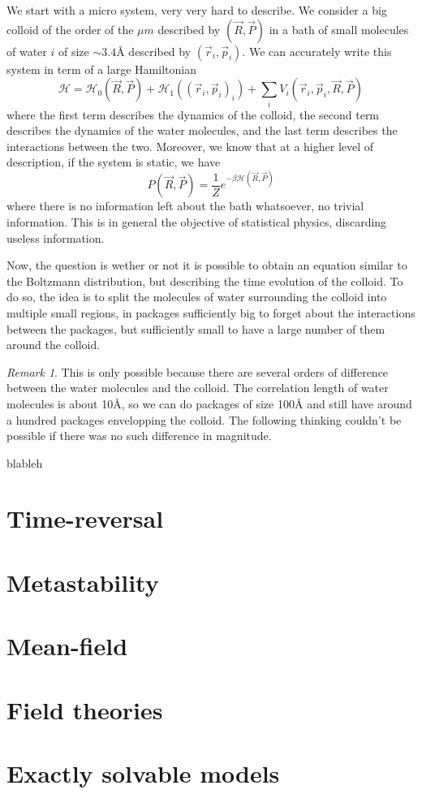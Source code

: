 \documentclass[a4paper]{book}
\theoremstyle{definition}
\theoremstyle{remark}
\newtheorem*{remark}{Remark}
\begin{document}
We start with a micro system, very very hard to describe. We consider a big colloid of the order of the $\mu m$ described by $(\vec{R}, \vec{P})$ in a bath of small molecules of water $i$ of size $\sim 3.4$\r{A} described by $(\vec{r}_i, \vec{p}_i)$. We can accurately write this system in term of a large Hamiltonian 
\begin{equation}
    \mathscr{H} = \mathscr{H}_0(\vec{R}, \vec{P}) + \mathscr{H}_1((\vec{r}_i, \vec{p}_i)_i) + \sum_i V_i(\vec{r}_i, \vec{p}_i, \vec{R}, \vec{P})
\end{equation}
where the first term describes the dynamics of the colloid, the second term describes the dynamics of the water molecules, and the last term describes the interactions between the two. Moreover, we know that at a higher level of description, if the system is static, we have 
\begin{equation}
    P(\vec{R}, \vec{P}) = \frac{1}{Z} e^{-\beta \mathscr{H}(\vec{R}, \vec{P})}
\end{equation}
where there is no information left about the bath whatsoever, no trivial information. This is in general the objective of statistical physics, discarding useless information. \par \medskip 
Now, the question is wether or not it is possible to obtain an equation similar to the Boltzmann distribution, but describing the time evolution of the colloid. To do so, the idea is to split the molecules of water surrounding the colloid into multiple small regions, in packages sufficiently big to forget about the interactions between the packages, but sufficiently small to have a large number of them around the colloid. 
\begin{remark}
    This is only possible because there are several orders of difference between the water molecules and the colloid. The correlation length of water molecules is about 10\r{A}, so we can do packages of size 100\r{A} and still have around a hundred packages envelopping the colloid. The following thinking couldn't be possible if there was no such difference in magnitude.
\end{remark}

blableh


\chapter{Time-reversal}

\chapter{Metastability}

\chapter{Mean-field}

\chapter{Field theories}

\chapter{Exactly solvable models}
\end{document}
